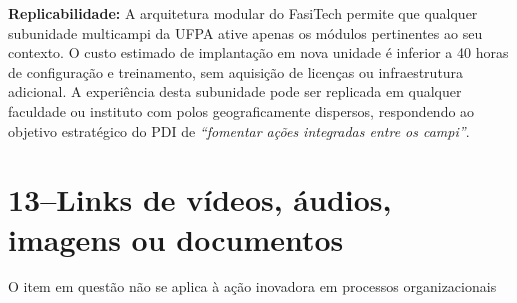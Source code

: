 \documentclass[12pt,a4paper]{article}
\begin{document}
\begin{tcolorbox}[successbox]
  \textbf{\faClone\;Replicabilidade:} A arquitetura modular do FasiTech permite que
  qualquer subunidade multicampi da UFPA ative apenas os módulos pertinentes ao seu
  contexto. O custo estimado de implantação em nova unidade é inferior a 40 horas de
  configuração e treinamento, sem aquisição de licenças ou infraestrutura adicional.
  A experiência desta subunidade pode ser replicada em qualquer
  faculdade ou instituto com polos geograficamente dispersos, respondendo ao objetivo
  estratégico do PDI de \textit{``fomentar ações integradas entre os campi''}.
\end{tcolorbox}
\section{13\;–\;Links de vídeos, áudios, imagens ou documentos}
O item em questão não se aplica à ação inovadora em processos organizacionais
\end{document}
